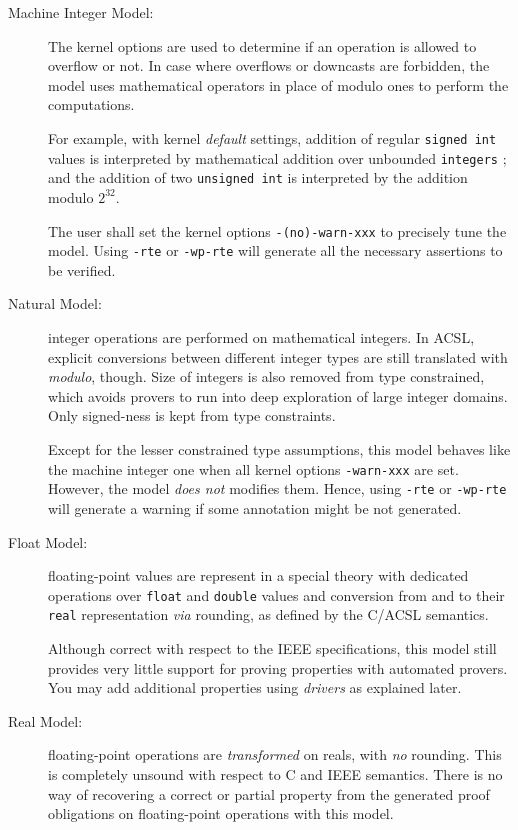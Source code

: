 \begin{description}

\item[Machine Integer Model:] The kernel options are used to determine if an
  operation is allowed to overflow or not. In case where overflows or downcasts
  are forbidden, the model uses mathematical operators in place of modulo ones
  to perform the computations.

  For example, with kernel \emph{default} settings, addition of regular
  \texttt{signed int} values is interpreted by mathematical addition over
  unbounded \texttt{integers} ; and the addition of two
  \texttt{unsigned int} is interpreted by the addition modulo $2^{32}$.

  The user shall set the kernel options \texttt{-(no)-warn-xxx} to precisely tune the
  model. Using \texttt{-rte} or \texttt{-wp-rte} will
  generate all the necessary assertions to be verified.

\item[Natural Model:] integer operations are performed on mathematical
  integers. In \textsf{ACSL}, explicit conversions between different integer
  types are still translated with \emph{modulo}, though. Size of integers is
  also removed from type constrained, which avoids provers to run into deep
  exploration of large integer domains. Only signed-ness is kept from type
  constraints.

  Except for the lesser constrained type assumptions, this model behaves like
  the machine integer one when all kernel options \texttt{-warn-xxx} are set.
  However, the model \emph{does not} modifies them. Hence, using \texttt{-rte}
  or \texttt{-wp-rte} will generate a warning if some annotation might be not
  generated.

\item[Float Model:] floating-point values are represent in a special
  theory with dedicated operations over \texttt{float} and \texttt{double}
  values and conversion from and to their \texttt{real} representation \emph{via}
  rounding, as defined by the \textsf{C/ACSL} semantics.

  Although correct with respect to the \textsc{IEEE} specifications, this
  model still provides very little support for proving properties with automated
  provers. You may add additional properties using \emph{drivers}
  as explained later.

\item[Real Model:] floating-point operations are \emph{transformed} on
  reals, with \emph{no} rounding. This is completely unsound with
  respect to \textsf{C} and \textsf{IEEE} semantics. There is no way
  of recovering a correct or partial property from the generated proof
  obligations on floating-point operations with this model.

\end{description}

